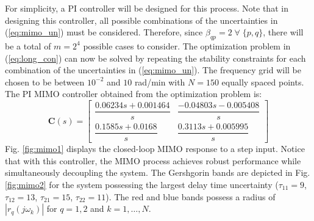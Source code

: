 \documentclass[A4, 10pt, conference]{ieeeconf}
\renewcommand{\vec}[1]{\mathbf{#1}}
\begin{document}
For simplicity, a PI controller will be designed for this process. Note that in designing this controller, all possible combinations of the uncertainties in (\ref{eq:mimo_un}) must be considered. Therefore, since $\beta_{qp}=2 \; \forall \; \{p,q\}$, there will be a total of $m=2^4$ possible cases to consider. The optimization problem in (\ref{eq:long_con}) can now be solved by repeating the stability constraints for each combination of the uncertainties in (\ref{eq:mimo_un}). The frequency grid will be chosen to be between $10^{-2}$ and $10$ rad/min with $N=150$ equally spaced points. The PI MIMO controller obtained from the optimization problem is:
$$
\renewcommand{\arraystretch}{1.3}
\vec{C}(s)=
\begin{bmatrix}
\dfrac{0.06234s + 0.001464}{s} & \dfrac{-0.04803s - 0.005408}{s} \\[0.4em]
\dfrac{0.1585s + 0.0168}{s} & \dfrac{0.3113s + 0.005995}{s}
\end{bmatrix}
$$
Fig. \ref{fig:mimo1} displays the closed-loop MIMO response to a step input. Notice that with this controller, the MIMO process achieves robust performance while simultaneously decoupling the system. The Gershgorin bands are depicted in Fig. \ref{fig:mimo2} for the system possessing the largest delay time uncertainty ($\tau_{11}=9$, $\tau_{12}=13$, $\tau_{21}=15$, $\tau_{22}=11$). The red and blue bands possess a radius of $|r_{q}(j\omega_k)|$ for $q=1,2$ and $k=1,\ldots,N$. 
\end{document}
